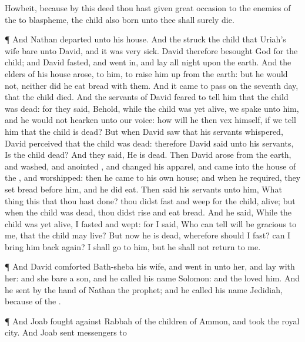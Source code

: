{Howbeit, because by this
deed thou hast
given great
occasion to the
enemies of the
{} to
blaspheme, the
child also
{}
born unto thee shall
surely
die.
\par }{\PP {}¶ And
Nathan
departed unto his
house. And the
{}
struck the
child that
Uriah’s
wife
bare unto
David, and it was very
sick.
David therefore
besought
God for the
child; and
David
fasted, and went
in, and
lay all
night upon the
earth.
And the
elders of his
house
arose,
{} to him, to raise him
up from the
earth: but he
would not, neither did he
eat
bread with them.
And it came to pass on the
seventh
day, that the
child
died. And the
servants of
David
feared to
tell him that the
child was
dead: for they
said, Behold, while the
child was yet
alive, we
spake unto him, and he would not
hearken unto our
voice: how will he
then
vex
himself, if we
tell him that the
child is
dead?
But when
David
saw that his
servants
whispered,
David
perceived that the
child was
dead: therefore
David
said unto his
servants, Is the
child
dead? And they
said, He is
dead.
Then
David
arose from the
earth, and
washed, and
anointed
{}, and
changed his
apparel, and
came into the
house of the
{}, and
worshipped: then he
came to his own
house; and when he
required, they
set
bread before him, and he did
eat.
Then
said his
servants unto him, What
thing
{} this that thou hast
done? thou didst
fast and
weep for the
child,
{}
alive; but when the
child was
dead, thou didst
rise and
eat
bread.
And he
said, While the
child was yet
alive, I
fasted and
wept: for I
said, Who can
tell
{}
{} will be
gracious to me, that the
child may
live?
But now he is
dead, wherefore should I
fast?
can I bring him back
again? I shall
go to him, but he shall not
return to me.
\par }{\PP {}¶ And
David
comforted
Bath-sheba his
wife, and went
in unto her, and
lay with her: and she
bare a
son, and he
called his
name
Solomon: and the
{}
loved him.
And he
sent by the
hand of
Nathan the
prophet; and he
called his
name
Jedidiah, because of the
{}.
\par }{\PP {}¶ And
Joab
fought against
Rabbah of the
children of
Ammon, and
took the
royal
city.
And
Joab
sent
messengers to
}
